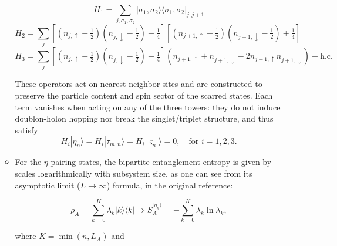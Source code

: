 \documentclass[11pt]{article}
\begin{document}
\begin{itemize}
\begin{itemize}
\begin{equation}
H_1 = \sum_{j,\sigma_1,\sigma_2} |\sigma_1, \sigma_2\rangle \langle \sigma_1, \sigma_2|_{j,j+1}
\end{equation}
\begin{equation}
H_2 = \sum_j \left[ \left(n_{j,\uparrow} - \tfrac{1}{2}\right)\left(n_{j,\downarrow} - \tfrac{1}{2}\right) + \tfrac{1}{4} \right] \left[ \left(n_{j+1,\uparrow} - \tfrac{1}{2}\right)\left(n_{j+1,\downarrow} - \tfrac{1}{2}\right) + \tfrac{1}{4} \right]
\end{equation}
\begin{equation}
H_3 = \sum_j \left[ \left(n_{j,\uparrow} - \tfrac{1}{2}\right)\left(n_{j,\downarrow} - \tfrac{1}{2}\right) + \tfrac{1}{4} \right] (n_{j+1,\uparrow} + n_{j+1,\downarrow} - 2 n_{j+1,\uparrow} n_{j+1,\downarrow}) + \text{h.c.}
\end{equation}

These operators act on nearest-neighbor sites and are constructed to preserve the particle content and spin sector of the scarred states. Each term vanishes when acting on any of the three towers: they do not induce doublon-holon hopping nor break the singlet/triplet structure, and thus satisfy
\begin{equation}
H_i |\eta_n\rangle = H_i |\tau_{m,n}\rangle = H_i |\varsigma_n\rangle = 0, \quad \text{for } i = 1,2,3.
\end{equation}


        \item For the $\eta$-pairing states, the bipartite entanglement entropy is given by scales logarithmically with subsystem size, as one can see from its asymptotic limit ($L\rightarrow\infty$) formula, in the original reference:
        
        \begin{equation}\label{aaa}
        \rho_A = \sum_{k=0}^{K} \lambda_k |k\rangle \langle k| \Rightarrow S^{|\eta_n\rangle }_A = - \sum_{k=0}^{K} \lambda_k \ln \lambda_k,
        \end{equation}
        
        where $K =\min{\left(n, L_A\right)}$ and
        

\end{itemize}
\end{itemize}
\end{document}
